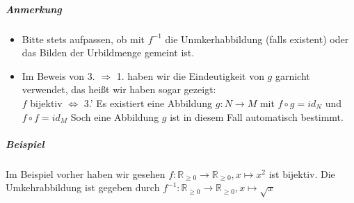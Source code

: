 \documentclass[a4paper]{scrartcl}
\theoremstyle{definition}
\theoremstyle{plain}
\theoremstyle{plain}
\theoremstyle{remark}
\theoremstyle{remark}
\theoremstyle{remark}
\begin{document}
\subparagraph{Anmerkung}
\label{sec-2-6-7-6-2}
\begin{itemize}
\item Bitte stets aufpassen, ob mit $f^{-1}$ die Unmkerhabbildung (falls existent) oder das Bilden der Urbildmenge gemeint ist.
\item Im Beweis von 3. $\Rightarrow$ 1. haben wir die Eindeutigkeit von $g$ garnicht verwendet, das heißt wir haben sogar gezeigt: \\
        $f$ bijektiv $\Leftrightarrow$ 3.' Es existiert eine Abbildung $g:N\to M$ mit $f\circ g = id_N$ und $f\circ f = id_M$ Soch eine Abbildung $g$ ist in diesem Fall automatisch bestimmt.
\end{itemize}
\subparagraph{Beispiel}
\label{sec-2-6-7-6-3}
Im Beispiel vorher haben wir gesehen $f:\mathbb{R}_{\geq 0} \to \mathbb{R}_{\geq 0}, x\mapsto x^2$ ist bijektiv.
Die Umkehrabbildung ist gegeben durch $f^{-1}:\mathbb{R}_{\geq 0} \to \mathbb{R}_{\geq 0}, x\mapsto \sqrt{x}$
\end{document}
